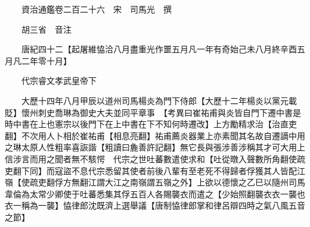 










 


 
 


 

  
  
  
  
  





  
  
  
  
  
 
  

  

  
  
  



  

 
 

  
   




  

  
  


  　　資治通鑑卷二百二十六　宋　司馬光　撰

　　胡三省　音注

　　唐紀四十二【起屠維恊洽八月盡重光作噩五月凡一年有奇始己未八月終辛酉五月凡二年零十月】

　　代宗睿文孝武皇帝下

　　大歷十四年八月甲辰以道州司馬楊炎為門下侍郎【大歷十二年楊炎以黨元載貶】懷州刺史喬琳為御史大夫並同平章事　【考異曰崔祐甫與炎皆自門下遷中書是時中書在上也憲宗以後門下在上中書在下不知何時遷改】上方勵精求治【治直吏翻】不次用人卜相於崔祐甫【相息亮翻】祐甫薦炎器業上亦素聞其名故自遷謫中用之琳太原人性粗率喜詼諧【粗讀曰麁善許記翻】無它長與張涉善涉稱其才可大用上信涉言而用之聞者無不駭愕　代宗之世吐蕃數遣使求和【吐從暾入聲數所角翻使疏吏翻下同】而寇盜不息代宗悉留其使者前後八輩有至老死不得歸者俘獲其人皆配江嶺【使疏吏翻俘方無翻江謂大江之南嶺謂五嶺之外】上欲以德懷之乙巳以隨州司馬韋倫為太常少卿使于吐蕃悉集其俘五百人各賜襲衣而遣之【少始照翻襲衣衣一襲也衣一稱為一襲】恊律郎沈既濟上選舉議【唐制恊律郎掌和律呂辯四時之氣八風五音之節】

